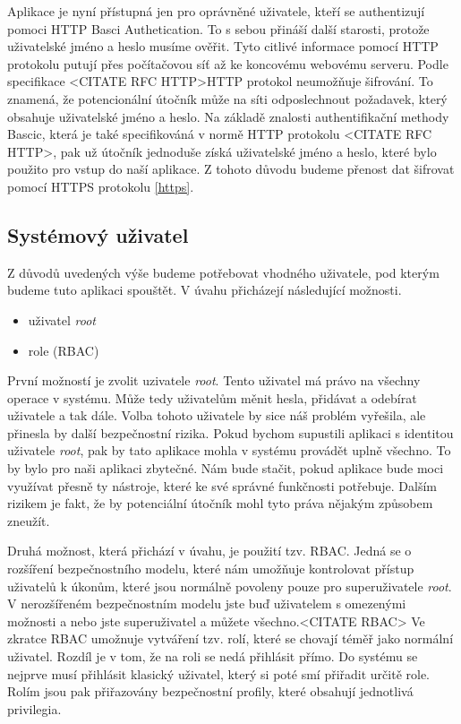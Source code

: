 Aplikace je nyní přístupná jen pro oprávněné uživatele, kteří se authentizují pomoci HTTP Basci Authetication. To s sebou přináší další starosti, protože uživatelské jméno a heslo musíme ověřit. Tyto citlivé informace pomocí HTTP protokolu putují přes počítačovou síť až ke koncovému webovému serveru. Podle specifikace <CITATE RFC HTTP>HTTP protokol neumožňuje šifrování. To znamená, že potencionální útočník může na síti odposlechnout požadavek, který obsahuje uživatelské jméno a heslo. Na základě znalosti authentifikační methody Bascic, která je také specifikováná v normě HTTP protokolu <CITATE RFC HTTP>, pak už útočník jednoduše získá uživatelské jméno a heslo, které bylo použito pro vstup do naší aplikace. Z tohoto důvodu budeme přenost dat šifrovat pomocí HTTPS protokolu \ref{https}.
    \subsection{Systémový uživatel}
    \label{sysuser}
    Z důvodů uvedených výše budeme potřebovat vhodného uživatele, pod kterým budeme tuto aplikaci spouštět. V úvahu přicházejí následující možnosti.
    \begin{itemize}
      \item uživatel \emph{root}
      \item role (RBAC)
    \end{itemize}

    První možností je zvolit uzivatele \emph{root}. Tento uživatel má právo na všechny operace v systému. Může tedy uživatelům měnit hesla, přidávat a odebírat uživatele a tak dále. Volba tohoto uživatele by sice náš problém vyřešila, ale přinesla by další bezpečnostní rizika. Pokud bychom supustili aplikaci s identitou uživatele \emph{root}, pak by tato aplikace mohla v systému provádět uplně všechno. To by bylo pro naši aplikaci zbytečné. Nám bude stačit, pokud aplikace bude moci využívat přesně ty nástroje, které ke své správné funkčnosti potřebuje. Dalším rizikem je fakt, že by potenciální útočník mohl tyto práva nějakým způsobem zneužít.

    Druhá možnost, která přichází v úvahu, je použití tzv. RBAC. Jedná se o rozšíření bezpečnostního modelu, které nám umožňuje kontrolovat přístup uživatelů k úkonům, které jsou normálně povoleny pouze pro superuživatele \emph{root}. V nerozšířeném bezpečnostním modelu jste buď uživatelem s omezenými možnosti a nebo jste superuživatel a můžete všechno.<CITATE RBAC> Ve zkratce RBAC umožnuje vytváření tzv. rolí, které se chovají téměř jako normální uživatel. Rozdíl je v tom, že na roli se nedá přihlásit přímo. Do systému se nejprve musí přihlásit klasický uživatel, který si poté smí přiřadit určitě role. Rolím jsou pak přiřazovány bezpečnostní profily, které obsahují jednotlivá privilegia.

